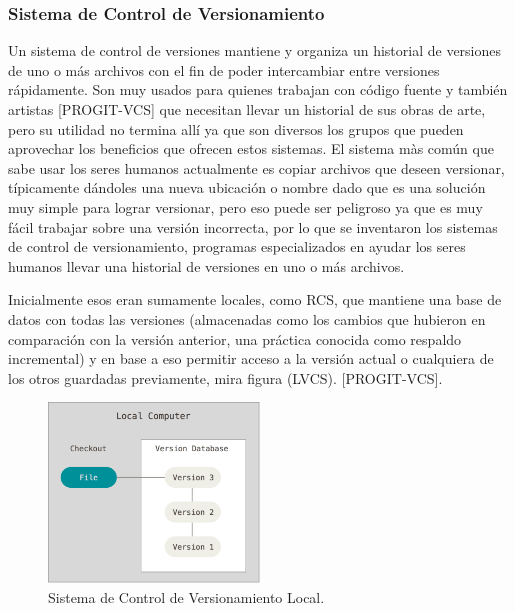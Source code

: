 \subsubsection{Sistema de Control de Versionamiento}
Un sistema de control de versiones mantiene y organiza un historial de versiones de uno o más archivos con el fin de poder intercambiar entre versiones rápidamente. Son muy usados para quienes trabajan con código fuente y también artistas [PROGIT-VCS] que necesitan llevar un historial de sus obras de arte, pero su utilidad no termina allí ya que son diversos los grupos que pueden aprovechar los beneficios que ofrecen estos sistemas. El sistema màs común que sabe usar los seres humanos actualmente es copiar archivos que deseen versionar, típicamente dándoles una nueva ubicación o nombre dado que es una solución muy simple para lograr versionar, pero eso puede ser peligroso ya que es muy fácil trabajar sobre una versión incorrecta, por lo que se inventaron los sistemas de control de versionamiento, programas especializados en ayudar los seres humanos llevar una historial de versiones en uno o más archivos.
 
Inicialmente esos eran sumamente locales, como RCS, que mantiene una base de datos con todas las versiones (almacenadas como los cambios que hubieron en comparación con la versión anterior, una práctica conocida como respaldo incremental) y en base a eso permitir acceso a la versión actual o cualquiera de los otros guardadas previamente, mira figura (LVCS). [PROGIT-VCS].

\begin{figure}
  \begin{center}
    \includegraphics[width=0.5\textwidth]{Figures/lvcs.png}
  \end{center}
  \caption{Sistema de Control de Versionamiento Local.} 
  \label{LVCS}
\end{figure}

